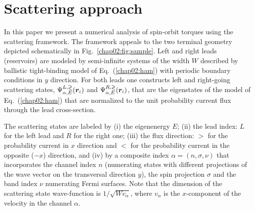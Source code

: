 \section{Scattering approach}

In this paper we present a numerical analysis of spin-orbit torques using the scattering framework. The framework appeals to the two terminal geometry depicted schematically in Fig.~\ref{chap02:fig:sample}. Left and right leads (reservoirs) are modeled by semi-infinite systems of the width $W$ described by ballistic tight-binding model of Eq.~(\ref{chap02:ham}) with periodic boundary conditions in $y$ direction. For both leads one constructs left and right-going scattering states, $\Psi^{L,\gtrless}_{\alpha,E}(\boldsymbol{r}_i)$ and $\Psi^{R,\gtrless}_{\alpha,E}(\boldsymbol{r}_i)$, that are the eigenstates of the model of Eq.~(\ref{chap02:ham}) that are normalized to the unit probability current flux through the lead cross-section. 

The scattering states are labeled by (i) the eigenenergy $E$; (ii) the lead index: $L$ for the left lead and $R$ for the right one; (iii) the flux direction: $>$ for the probability current in $x$ direction and $<$ for the probability current in the opposite ($-x$)  direction, and (iv) by a composite index $\alpha=(n,\sigma,\nu)$ that incorporates the channel index $n$ (numerating states with different projections of the wave vector on the transversal direction $y$), the spin projection $\sigma$ and the band index $\nu$ numerating Fermi surfaces. Note that the dimension of the scattering state wave-function is $1/\sqrt{Wv_\alpha}$, where $v_\alpha$ is the $x$-component of the velocity in the channel $\alpha$.  

